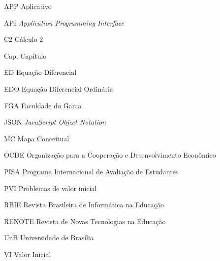 \begin{siglas}
  \item[APP] Aplicativo
  \item[API] \textit{Application Programming Interface}
  \item[C2] Cálculo 2
  \item[Cap.] Capítulo
  \item[ED] Equação Diferencial
  \item[EDO] Equação Diferencial Ordinária
  \item[FGA] Faculdade do Gama
  \item[JSON] \textit{JavaScript Object Notation}
  \item[MC] Mapa Conceitual
  \item[OCDE] Organização para a Cooperação e Desenvolvimento Econômico
  \item[PISA] Programa Internacional de Avaliação de Estudantes
  \item[PVI] Problemas de valor inicial
  \item[RBIE] Revista Brasileira de Informática na Educação
  \item[RENOTE] Revista de Novas Tecnologias na Educação
  \item[UnB] Universidade de Brasília
  \item[VI] Valor Inicial
\end{siglas}
